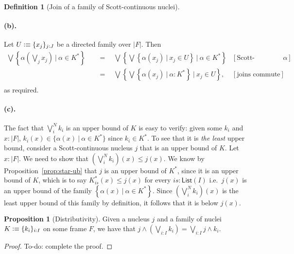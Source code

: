 \documentclass[a4paper, 11pt]{article}
\theoremstyle{definition}
\newtheorem{prop}{Proposition}
\newtheorem{defn}{Definition}
\newcommand{\setof}[1]{\left\{ #1 \right\}}
\newcommand{\is}{\vcentcolon\equiv}
\newcommand{\todo}[1]{{\large\color{orange}\textsf{To-do: #1.}}}
\begin{document}
\begin{defn}[Join of a family of Scott-continuous nuclei]
  \paragraph{(b).} Let $U \is \{ x_j \}_{j : J}$ be a directed family over $| F |$. Then
  \begin{align*}
       \bigvee \setof{ \alpha\left(\bigvee_j x_j\right) ~|~ \alpha \in K^* }
  &\quad=\quad \bigvee \setof{ \bigvee \setof{ \alpha(x_j) ~|~ x_j \in U } ~|~ \alpha \in K^* }  & [\text{Scott-continuity of $\alpha$}] \\
  &\quad=\quad \bigvee \setof{ \bigvee \setof{ \alpha(x_j) ~|~ \alpha : K^* } ~|~ x_j \in U }, & [\text{joins commute}]           \\
  \end{align*}
  as required.

  \paragraph{(c).} The fact that $\bigvee^N_i k_i$ is an upper bound of $K$ is easy to verify:
  given some $k_i$ and $x : | F |$, $k_i(x) \in \{ \alpha(x) ~|~ \alpha \in K^* \}$ since $k_i \in K^*$. To see that
  it is \emph{the least} upper bound, consider a Scott-continuous nucleus $j$ that is an upper bound
  of $K$. Let $x : | F |$. We need to show that $\left(\bigvee^N_i k_i\right)(x) \le j(x)$. We know by
  Proposition~\ref{prop:star-ub} that $j$ is an upper bound of $K^*$, since it is an upper bound of
  $K$, which is to say $K^*_{is}(x) \le j(x)$ for every $is : \mathsf{List}(I)$ i.e.\ $j(x)$ is an
  upper bound of the family $\setof{ \alpha(x) ~|~ \alpha \in K^* }$. Since $\left(\bigvee^N_i k_i\right)(x)$ is the
  least upper bound of this family by definition, it follows that it is below $j(x)$.
\end{defn}

\begin{prop}[Distributivity]
  Given a nucleus $j$ and a family of nuclei $K \is \{ k_i \}_{i : I}$ on some frame $F$, we have
  that $j \wedge \left(\bigvee_{i : I} k_i\right) = \bigvee_{i : I} j \wedge k_i$.
\end{prop}
\begin{proof}
  \todo{complete the proof}
\end{proof}

\printbibliography
\end{document}
